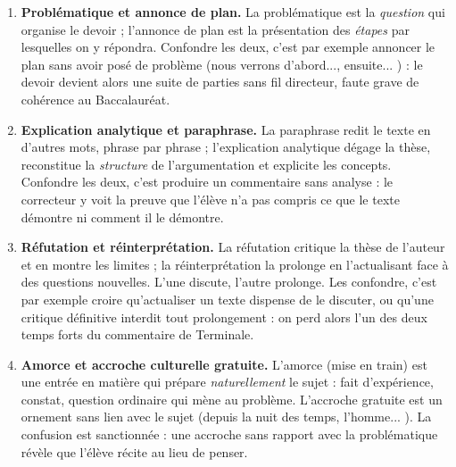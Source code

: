 \documentclass[11pt]{article}
\begin{document}
\begin{corrige}
\begin{enumerate}
\item \textbf{Problématique et annonce de plan.} La problématique est la \emph{question} qui organise le devoir ; l'annonce de plan est la présentation des \emph{étapes} par lesquelles on y répondra. Confondre les deux, c'est par exemple annoncer le plan sans avoir posé de problème (\guillemotleft nous verrons d'abord..., ensuite... \guillemotright) : le devoir devient alors une suite de parties sans fil directeur, faute grave de cohérence au Baccalauréat.
\item \textbf{Explication analytique et paraphrase.} La paraphrase redit le texte en d'autres mots, phrase par phrase ; l'explication analytique dégage la thèse, reconstitue la \emph{structure} de l'argumentation et explicite les concepts. Confondre les deux, c'est produire un commentaire sans analyse : le correcteur y voit la preuve que l'élève n'a pas compris ce que le texte démontre ni comment il le démontre.
\item \textbf{Réfutation et réinterprétation.} La réfutation critique la thèse de l'auteur et en montre les limites ; la réinterprétation la prolonge en l'actualisant face à des questions nouvelles. L'une discute, l'autre prolonge. Les confondre, c'est par exemple croire qu'actualiser un texte dispense de le discuter, ou qu'une critique définitive interdit tout prolongement : on perd alors l'un des deux temps forts du commentaire de Terminale.
\item \textbf{Amorce et accroche culturelle gratuite.} L'amorce (mise en train) est une entrée en matière qui prépare \emph{naturellement} le sujet : fait d'expérience, constat, question ordinaire qui mène au problème. L'accroche gratuite est un ornement sans lien avec le sujet (\guillemotleft depuis la nuit des temps, l'homme... \guillemotright). La confusion est sanctionnée : une accroche sans rapport avec la problématique révèle que l'élève récite au lieu de penser.
\end{enumerate}
\end{corrige}
\end{document}
